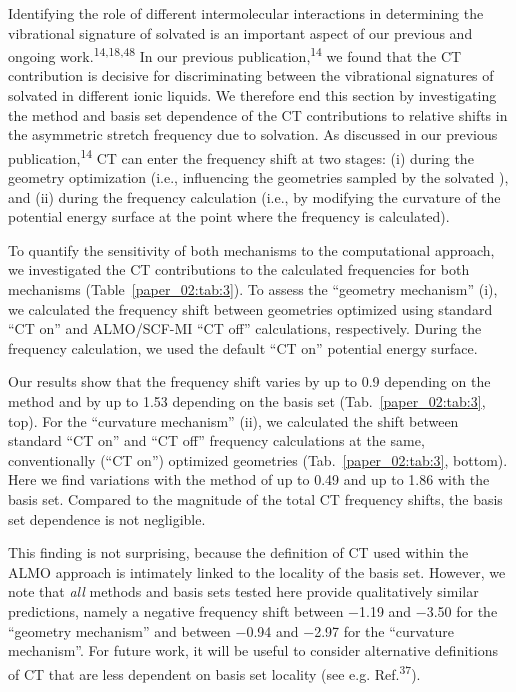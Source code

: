 Identifying the role of different intermolecular interactions in determining the vibrational signature of solvated  is an important aspect of our previous and ongoing work.\textsuperscript{14,18,48} In our previous publication,\textsuperscript{14} we found that the CT contribution is decisive for discriminating between the vibrational signatures of  solvated in different ionic liquids. We therefore end this section by investigating the method and basis set dependence of the CT contributions to relative shifts in the  asymmetric stretch frequency due to solvation. As discussed in our previous publication,\textsuperscript{14} CT can enter the frequency shift at two stages: (i) during the geometry optimization (i.e., influencing the geometries sampled by the solvated ), and (ii) during the frequency calculation (i.e., by modifying the curvature of the potential energy surface at the point where the frequency is calculated).

To quantify the sensitivity of both mechanisms to the computational approach, we investigated the CT contributions to the calculated frequencies for both mechanisms (Table~\ref{paper_02:tab:3}). To assess the ``geometry mechanism'' (i), we calculated the frequency shift between geometries optimized using standard ``CT on'' and ALMO/SCF-MI ``CT off'' calculations, respectively. During the frequency calculation, we used the default ``CT on'' potential energy surface.

Our results show that the frequency shift varies by up to \SI{0.9}{\wavenumber} depending on the method and by up to \SI{1.53}{\wavenumber} depending on the basis set (Tab.~\ref{paper_02:tab:3}, top). For the ``curvature mechanism'' (ii), we calculated the shift between standard ``CT on'' and ``CT off'' frequency calculations at the same, conventionally (``CT on'') optimized geometries (Tab.~\ref{paper_02:tab:3}, bottom). Here we find variations with the method of up to \SI{0.49}{\wavenumber} and up to \SI{1.86}{\wavenumber} with the basis set. Compared to the magnitude of the total CT frequency shifts, the basis set dependence is not negligible.

This finding is not surprising, because the definition of CT used within the ALMO approach is intimately linked to the locality of the basis set. However, we note that \emph{all} methods and basis sets tested here provide qualitatively similar predictions, namely a negative frequency shift between \num{-1.19} and \SI{-3.50}{\wavenumber} for the ``geometry mechanism'' and between \num{-0.94} and \SI{-2.97}{\wavenumber} for the ``curvature mechanism''. For future work, it will be useful to consider alternative definitions of CT that are less dependent on basis set locality (see e.g. Ref.\textsuperscript{37}).

